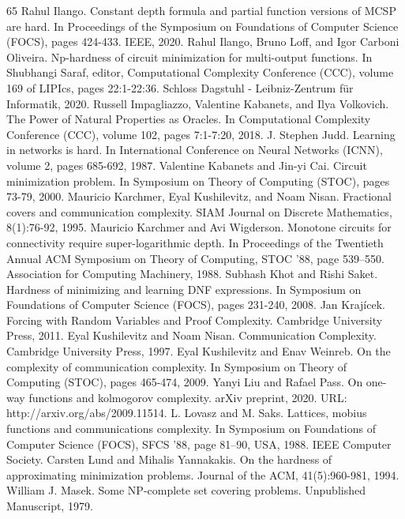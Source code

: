 \documentclass[10pt,a4paper]{article}
\begin{document}
\begin{thebibliography}{65}
 Rahul Ilango. Constant depth formula and partial function versions of MCSP are hard. In Proceedings of the Symposium on Foundations of Computer Science (FOCS), pages 424-433. IEEE, 2020.
 Rahul Ilango, Bruno Loff, and Igor Carboni Oliveira. Np-hardness of circuit minimization for multi-output functions. In Shubhangi Saraf, editor, Computational Complexity Conference (CCC), volume 169 of LIPIcs, pages 22:1-22:36. Schloss Dagstuhl - Leibniz-Zentrum für Informatik, 2020.
 Russell Impagliazzo, Valentine Kabanets, and Ilya Volkovich. The Power of Natural Properties as Oracles. In Computational Complexity Conference (CCC), volume 102, pages 7:1-7:20, 2018.
 J. Stephen Judd. Learning in networks is hard. In International Conference on Neural Networks (ICNN), volume 2, pages 685-692, 1987.
 Valentine Kabanets and Jin-yi Cai. Circuit minimization problem. In Symposium on Theory of Computing (STOC), pages 73-79, 2000.
 Mauricio Karchmer, Eyal Kushilevitz, and Noam Nisan. Fractional covers and communication complexity. SIAM Journal on Discrete Mathematics, 8(1):76-92, 1995.
 Mauricio Karchmer and Avi Wigderson. Monotone circuits for connectivity require super-logarithmic depth. In Proceedings of the Twentieth Annual ACM Symposium on Theory of Computing, STOC '88, page 539–550. Association for Computing Machinery, 1988.
 Subhash Khot and Rishi Saket. Hardness of minimizing and learning DNF expressions. In Symposium on Foundations of Computer Science (FOCS), pages 231-240, 2008.
 Jan Krajícek. Forcing with Random Variables and Proof Complexity. Cambridge University Press, 2011.
 Eyal Kushilevitz and Noam Nisan. Communication Complexity. Cambridge University Press, 1997.
 Eyal Kushilevitz and Enav Weinreb. On the complexity of communication complexity. In Symposium on Theory of Computing (STOC), pages 465-474, 2009.
 Yanyi Liu and Rafael Pass. On one-way functions and kolmogorov complexity. arXiv preprint, 2020. URL: http://arxiv.org/abs/2009.11514.
 L. Lovasz and M. Saks. Lattices, mobius functions and communications complexity. In Symposium on Foundations of Computer Science (FOCS), SFCS '88, page 81–90, USA, 1988. IEEE Computer Society.
 Carsten Lund and Mihalis Yannakakis. On the hardness of approximating minimization problems. Journal of the ACM, 41(5):960-981, 1994.
 William J. Masek. Some NP-complete set covering problems. Unpublished Manuscript, 1979.

\end{thebibliography}
\end{document}
